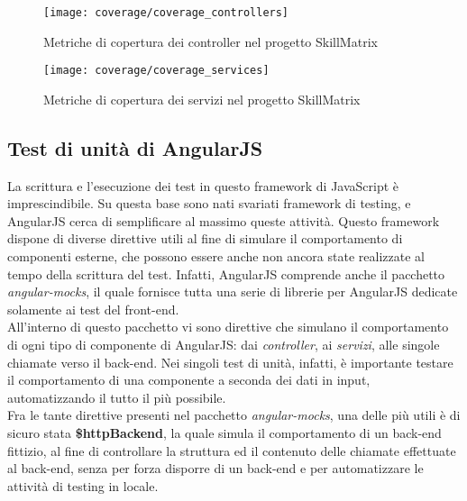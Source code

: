 \begin{figure}[!h] 
    \centering 
    \texttt{[image: coverage/coverage\_controllers]} 
    \caption{Metriche di copertura dei controller nel progetto SkillMatrix}
\end{figure}

\begin{figure}[!h] 
    \centering 
    \texttt{[image: coverage/coverage\_services]} 
    \caption{Metriche di copertura dei servizi nel progetto SkillMatrix}
\end{figure}

\subsection{Test di unità di AngularJS}
La scrittura e l'esecuzione dei test in questo framework di JavaScript è imprescindibile. Su questa base sono nati svariati framework di testing, e AngularJS cerca di semplificare al massimo queste attività. Questo framework dispone di diverse direttive utili al fine di simulare il comportamento di componenti esterne, che possono essere anche non ancora state realizzate al tempo della scrittura del test. Infatti, AngularJS comprende anche il pacchetto \emph{angular-mocks}, il quale fornisce tutta una serie di librerie per AngularJS dedicate solamente ai test del \gls{front-end}.\\
All'interno di questo pacchetto vi sono direttive che simulano il comportamento di ogni tipo di componente di AngularJS: dai \emph{controller}, ai \emph{servizi}, alle singole chiamate verso il \gls{back-end}. Nei singoli test di unità, infatti, è importante testare il comportamento di una componente a seconda dei dati in input, automatizzando il tutto il più possibile.\\
Fra le tante direttive presenti nel pacchetto \emph{angular-mocks}, una delle più utili è di sicuro stata \textbf{\$httpBackend}, la quale simula il comportamento di un \gls{back-end} fittizio, al fine di controllare la struttura ed il contenuto delle chiamate effettuate al \gls{back-end}, senza per forza disporre di un \gls{back-end} e per automatizzare le attività di testing in locale.




\newpage

